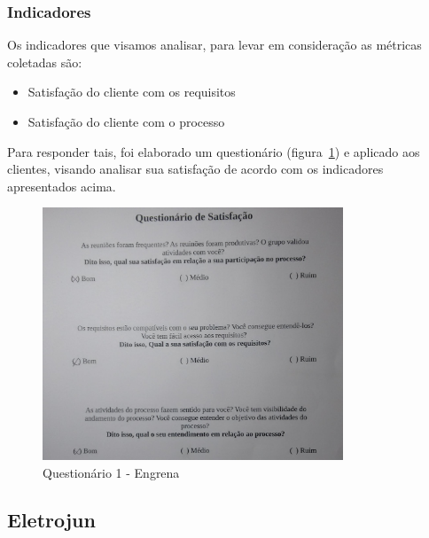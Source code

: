 \subsubsection{Indicadores}

Os indicadores que visamos analisar, para levar em consideração as métricas coletadas são:
\begin{itemize}
\item Satisfação do cliente com os requisitos
\item Satisfação do cliente com o processo
\end{itemize}

Para responder tais, foi elaborado um questionário (figura~\ref{fig:quest1}) e aplicado aos clientes, visando analisar sua satisfação de acordo com os indicadores apresentados acima.

\begin{figure}[H]
  \center
  \includegraphics[width=0.8\textwidth]{figuras/quest1}
  \caption{Questionário 1 - Engrena}
  \label{fig:quest1}
\end{figure}

\subsection{Eletrojun}

